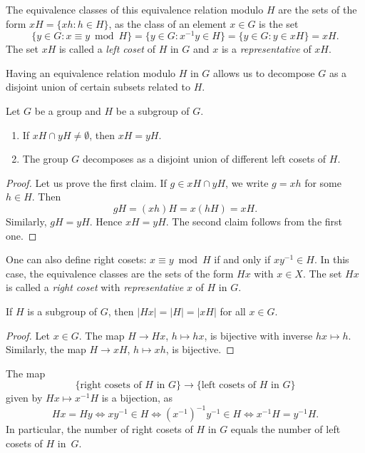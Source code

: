 The equivalence classes of this equivalence relation modulo $H$
are the sets of the form $xH=\{xh:h\in H\}$, as the class 
of an element $x\in G$ is the set 
\[
        \{y\in G:x\equiv y\bmod H\}=\{y\in G:x^{-1}y\in H\}=\{y\in G:y\in xH\}=xH.
\]
The set $xH$ is called 
a \emph{left coset} of $H$ in $G$ and $x$ is 
a \emph{representative} of $xH$.

Having an equivalence relation modulo $H$ in $G$ allows us to
decompose $G$ as a disjoint union of certain subsets related to $H$. 

\begin{proposition}
Let $G$ be a group and $H$ be a subgroup of $G$. 
\begin{enumerate}
\item If $xH\cap yH\ne\emptyset$, then $xH=yH$.
\item The group $G$ decomposes as a disjoint union 
of different left cosets of $H$.
\end{enumerate}
\end{proposition}

\begin{proof}
    Let us prove the first claim. If $g\in xH\cap yH$, we write 
    $g=xh$ for some $h\in H$. Then 
    \[
    gH=(xh)H=x(hH)=xH.
    \]
    Similarly, $gH=yH$. Hence $xH=yH$.
    The second claim follows from the first one. 
\end{proof}

One can also define right cosets: $x\equiv
y\bmod H$ if and only if $xy^{-1}\in H$. In this case, 
the equivalence classes are 
the sets of the form $Hx$ with $x\in X$. The set $Hx$ 
is called a \emph{right coset}
with \emph{representative} $x$ of $H$ in $G$. 

\begin{proposition}
    If $H$ is a subgroup of $G$, then  $|Hx|=|H|=|xH|$ for all $x\in G$.
\end{proposition}

\begin{proof}
    Let $x\in G$. The map $H\to Hx$, $h\mapsto hx$, is bijective 
    with inverse $hx\mapsto h$. Similarly, the map $H\to xH$,
    $h\mapsto xh$, is bijective.
\end{proof}

The map 
\[
        \{\text{right cosets of $H$ in $G$}\}\to\{\text{left cosets of $H$ in $G$}\}
\]
given by $Hx\mapsto x^{-1}H$ is a bijection, as 
\[
        Hx=Hy
        \Longleftrightarrow xy^{-1}\in H
        \Longleftrightarrow (x^{-1})^{-1}y^{-1}\in H
        \Longleftrightarrow x^{-1}H=y^{-1}H.
\]
In particular, the number of right cosets of $H$ in $G$
equals the number of left cosets of $H$ in~$G$. 

